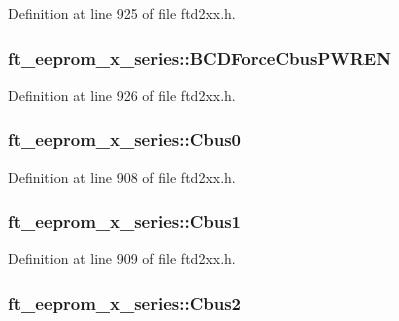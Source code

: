Definition at line 925 of file ftd2xx.h.\hypertarget{structft__eeprom__x__series_ad8b6a67ca67de8dd7c892d2758bd1bba}{
\subsubsection[{BCDForceCbusPWREN}]{ {\bf ft\_\-eeprom\_\-x\_\-series::BCDForceCbusPWREN}}}
\label{structft__eeprom__x__series_ad8b6a67ca67de8dd7c892d2758bd1bba}


Definition at line 926 of file ftd2xx.h.\hypertarget{structft__eeprom__x__series_a8204c3cd3a8d8ea0f1461217fdc7ce83}{
\subsubsection[{Cbus0}]{ {\bf ft\_\-eeprom\_\-x\_\-series::Cbus0}}}
\label{structft__eeprom__x__series_a8204c3cd3a8d8ea0f1461217fdc7ce83}


Definition at line 908 of file ftd2xx.h.\hypertarget{structft__eeprom__x__series_ac2cfe6ac98141e7f3552a3884304a6b3}{
\subsubsection[{Cbus1}]{ {\bf ft\_\-eeprom\_\-x\_\-series::Cbus1}}}
\label{structft__eeprom__x__series_ac2cfe6ac98141e7f3552a3884304a6b3}


Definition at line 909 of file ftd2xx.h.\hypertarget{structft__eeprom__x__series_a534b7e3869bd969bb2fe23cf3e2ffee5}{
\subsubsection[{Cbus2}]{ {\bf ft\_\-eeprom\_\-x\_\-series::Cbus2}}}
\label{structft__eeprom__x__series_a534b7e3869bd969bb2fe23cf3e2ffee5}


